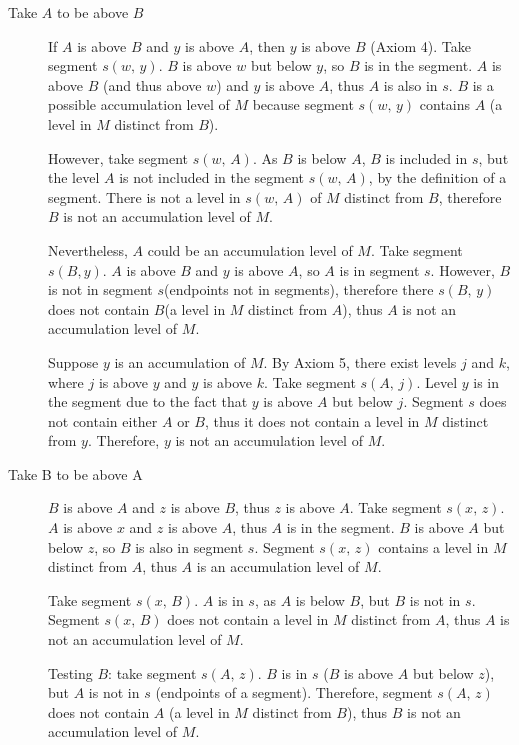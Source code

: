 \begin{description}
    \item[Take $A$ to be above $B$] If $A$ is above $B$ and $y$ is above $A$, then $y$ is above $B$ (Axiom 4). Take segment $s(w,\, y)$. $B$ is above $w$ but below $y$, so $B$ is in the segment. $A$ is above $B$ (and thus above $w$) and $y$ is above $A$, thus $A$ is also in $s$. $B$ is a possible accumulation level of $M$ because segment $s(w,\, y)$ contains $A$ (a level in $M$ distinct from $B$).

    However, take segment $s(w,\, A)$. As $B$ is below $A$, $B$ is included in $s$, but the level $A$ is not included in the segment $s(w,\, A)$, by the definition of a segment. There is not a level in $s(w,\, A)$ of $M$ distinct from $B$, therefore $B$ is not an accumulation level of $M$.

    Nevertheless, $A$ could be an accumulation level of $M$. Take segment $s(B, y)$. $A$ is above $B$ and $y$ is above $A$, so $A$ is in segment $s$. However, $B$ is not in segment $s$(endpoints not in segments), therefore there $s(B,\, y)$ does not contain $B$(a level in $M$ distinct from $A$), thus $A$ is not an accumulation level of $M$.

    Suppose $y$ is an accumulation of $M$. By Axiom 5, there exist levels $j$ and $k$, where $j$ is above $y$ and $y$ is above $k$. Take segment $s(A,\, j)$. Level $y$ is in the segment due to the fact that $y$ is above $A$ but below $j$. Segment $s$ does not contain either $A$ or $B$, thus it does not contain a level in $M$ distinct from $y$. Therefore, $y$ is not an accumulation level of $M$.

    \item[Take B to be above A] $B$ is above $A$ and $z$ is above $B$, thus $z$ is above $A$. Take segment $s(x,\, z)$. $A$ is above $x$ and $z$ is above $A$, thus $A$ is in the segment. $B$ is above $A$ but below $z$, so $B$ is also in segment $s$. Segment $s(x,\, z)$ contains a level in $M$ distinct from $A$, thus $A$ is an accumulation level of $M$.

    Take segment $s(x,\, B)$. $A$ is in $s$, as $A$ is below $B$, but $B$ is not in $s$. Segment $s(x,\, B)$ does not contain a level in $M$ distinct from $A$, thus $A$ is not an accumulation level of $M$.

    Testing $B$: take segment $s(A,\, z)$. $B$ is in $s$ ($B$ is above $A$ but below $z$), but $A$ is not in $s$ (endpoints of a segment). Therefore, segment $s(A,\, z)$ does not contain $A$ (a level in $M$ distinct from $B$), thus $B$ is not an accumulation level of $M$.
\end{description}

